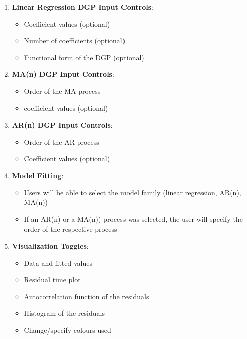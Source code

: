 \documentclass{article}
\begin{document}
\begin{normalsize}
\begin{enumerate}
             \item \textbf{Linear Regression DGP Input Controls}: 
                \begin{itemize}
                    \item Coefficient values (optional)
                    \item Number of coefficients (optional)
                    \item  Functional form of the DGP (optional)
                \end{itemize}
            \item \textbf{MA(n) DGP Input Controls}: 
                \begin{itemize}
                    \item Order of the MA process
                    \item coefficient values (optional)
                \end{itemize}
            \item \textbf{AR(n) DGP Input Controls}: 
                \begin{itemize}
                    \item Order of the AR process
                    \item Coefficient values (optional)
                \end{itemize}
            \item \textbf{Model Fitting}: 
                \begin{itemize}
                    \item Users will be able to select the model family (linear regression, AR(n), MA(n))
                    \item If an AR(n) or a MA(n)) process was selected, the user will specify the order of the respective process
                \end{itemize}
            \item \textbf{Visualization Toggles}: 
                \begin{itemize}
                    \item Data and fitted values
                    \item Residual time plot
                    \item Autocorrelation function of the residuals
                    \item Histogram of the residuals
                    \item  Change/specify colours used
                \end{itemize}
        \end{enumerate}

\end{normalsize}

\nocite{*}


\vspace{0.8cm}
\end{document}
